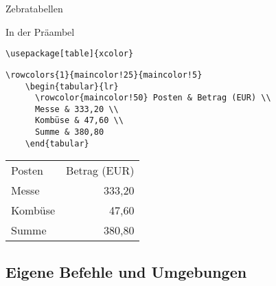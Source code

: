 \begin{Frame}[fragile]{Zebratabellen}
  \begin{Block}{In der Präambel}
    \begin{lstlisting}[gobble=6,style=block]
      \usepackage[table]{xcolor}
    \end{lstlisting}
  \end{Block}

  \begin{lstlisting}[gobble=4]
    \rowcolors{1}{maincolor!25}{maincolor!5}
    \begin{tabular}{lr}
      \rowcolor{maincolor!50} Posten & Betrag (EUR) \\
      Messe & 333,20 \\
      Kombüse & 47,60 \\
      Summe & 380,80
    \end{tabular}
  \end{lstlisting}

  \begin{center}
    \begin{tabular}{lr}
      \rowcolor{maincolor!50} Posten & Betrag (EUR) \\
      Messe & 333,20 \\
      Kombüse & 47,60 \\
      Summe & 380,80
    \end{tabular}
  \end{center}
\end{Frame}

\subsection{Eigene Befehle und Umgebungen}

